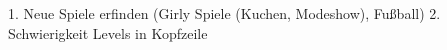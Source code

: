 1. Neue Spiele erfinden (Girly Spiele (Kuchen, Modeshow), Fußball)
2. Schwierigkeit Levels in Kopfzeile

